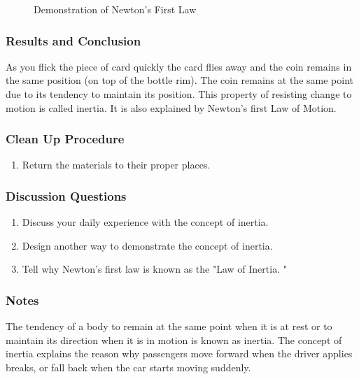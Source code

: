 \begin{figure}
\begin{center}
\def\svgwidth{200pt}

\caption{Demonstration of Newton's First Law}
\label{fig:inertia}
\end{center}
\end{figure}

\subsubsection*{Results and Conclusion}
As you flick the piece of card quickly the card flies away and the coin remains in the same position (on top of the bottle rim). The coin remains at the same point due to its tendency to maintain its position. This property of resisting change to motion is called inertia. It is also explained by Newton's first Law of Motion.  

\subsubsection*{Clean Up Procedure}
\begin{enumerate}
\item{Return the materials to their proper places.} 
\end{enumerate}

\subsubsection*{Discussion Questions}
\begin{enumerate}
\item{Discuss your daily experience with the concept of inertia.} 
\item{Design another way to demonstrate the concept of inertia.} 
\item{Tell why Newton's first law is known as the "Law of Inertia.  "}
\end{enumerate}

\subsubsection*{Notes}
The tendency of a body to remain at the same point when it is at rest or to maintain its direction when it is in motion is known as inertia. The concept of inertia explains the reason why passengers move forward when the driver applies breaks, or fall back when the car starts moving suddenly.
